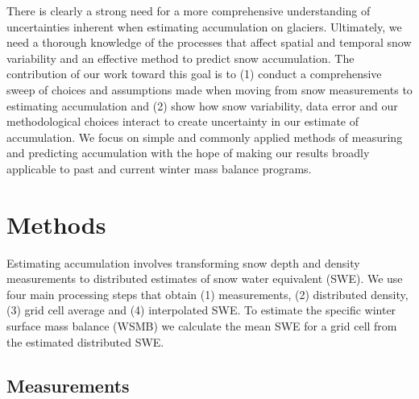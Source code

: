\documentclass[review,oneside, letterpaper]{igs}
\begin{document}
There is clearly a strong need for a more comprehensive understanding of uncertainties inherent when estimating accumulation on glaciers. Ultimately, we need a thorough knowledge of the processes that affect spatial and temporal snow variability and an effective method to predict snow accumulation. The contribution of our work toward this goal is to (1) conduct a comprehensive sweep of choices and assumptions made when moving from snow measurements to estimating accumulation and (2) show how snow variability, data error and our methodological choices interact to create uncertainty in our estimate of accumulation. We focus on simple and commonly applied methods of measuring and predicting accumulation with the hope of making our results broadly applicable to past and current winter mass balance programs.




\section{Methods}

Estimating accumulation involves transforming snow depth and density measurements to distributed estimates of snow water equivalent (SWE). We use four main processing steps that obtain (1) measurements, (2) distributed density, (3) grid cell average and (4) interpolated SWE. To estimate the specific winter surface mass balance (WSMB) we calculate the mean SWE for a grid cell from the estimated distributed SWE. 

\subsection{Measurements}
\end{document}
